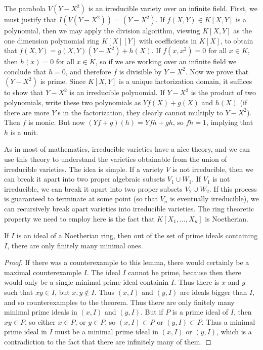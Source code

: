 \begin{example}
    The parabola $V(Y - X^2)$ is an irreducible variety over an infinite field. First, we must justify that $I(V(Y - X^2)) = (Y - X^2)$. If $f(X,Y) \in K[X,Y]$ is a polynomial, then we may apply the division algorithm, viewing $K[X,Y]$ as the one dimension polynomial ring $K[X][Y]$ with coefficients in $K[X]$, to obtain that $f(X,Y) = g(X,Y) (Y - X^2) + h(X)$. If $f(x,x^2) = 0$ for all $x \in K$, then $h(x) = 0$ for all $x \in K$, so if we are working over an infinite field we conclude that $h = 0$, and therefore $f$ is divisible by $Y - X^2$. Now we prove that $(Y - X^2)$ is prime. Since $K[X,Y]$ is a unique factorization domain, it suffices to show that $Y - X^2$ is an irreducible polynomial. If $Y - X^2$ is the product of two polynomials, write these two polynomials as $Yf(X) + g(X)$ and $h(X)$ (if there are more $Y$'s in the factorization, they clearly cannot multiply to $Y - X^2$). Then $f$ is monic. But now $(Yf + g)(h) = Yfh + gh$, so $fh = 1$, implying that $h$ is a unit.
\end{example}

As in most of mathematics, irreducible varieties have a nice theory, and we can use this theory to understand the varieties obtainable from the union of irreducible varieties. The idea is simple. If a variety $V$ is not irreducible, then we can break it apart into two proper algebraic subsets $V_1 \cup W_1$. If $V_1$ is not irreducible, we can break it apart into two proper subsets $V_2 \cup W_2$. If this process is guaranteed to terminate at some point (so that $V_n$ is eventually irreducible), we can recursively break apart varieties into irreducible varieties. The ring theoretic property we need to employ here is the fact that $K[X_1, \dots, X_n]$ is Noetherian.

\begin{lemma}
    If $I$ is an ideal of a Noetherian ring, then out of the set of prime ideals containing $I$, there are only finitely many minimal ones.
\end{lemma}
\begin{proof}
    If there was a counterexample to this lemma, there would certainly be a maximal counterexample $I$. The ideal $I$ cannot be prime, because then there would only be a single minimal prime ideal containin $I$. Thus there is $x$ and $y$ such that $xy \in I$, but $x, y \not \in I$. Thus $(x,I)$ and $(y,I)$ are ideals bigger than $I$, and so counterexamples to the theorem. Thus there are only finitely many minimal prime ideals in $(x,I)$ and $(y,I)$. But if $P$ is a prime ideal of $I$, then $xy \in P$, so either $x \in P$, or $y \in P$, so $(x,I) \subset P$ or $(y,I) \subset P$. Thus a minimal prime ideal in $I$ must be a minimal prime ideal in $(x,I)$ or $(y,I)$, which is a contradiction to the fact that there are infinitely many of them.
\end{proof}

